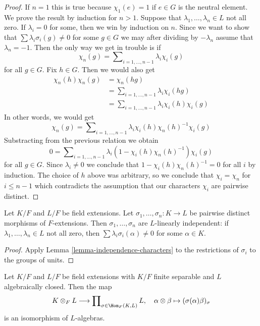 \begin{proof}
If $n = 1$ this is true because $\chi_1(e) = 1$ if $e \in G$ is the
neutral element. We prove the result by induction for $n > 1$.
Suppose that $\lambda_1, \ldots, \lambda_n \in L$ not all zero.
If $\lambda_i = 0$ for some, then we win by induction on $n$.
Since we want to show that $\sum \lambda_i\sigma_i(g) \not = 0$
for some $g \in G$ we may after dividing by $-\lambda_n$
assume that $\lambda_n = -1$. Then the only way we get in trouble
is if
$$
\chi_n(g) = \sum\nolimits_{i = 1, \ldots, n - 1} \lambda_i\chi_i(g)
$$
for all $g \in G$. Fix $h \in G$. Then we would also get
\begin{align*}
\chi_n(h)\chi_n(g) & = \chi_n(hg) \\
& = \sum\nolimits_{i = 1, \ldots, n - 1} \lambda_i\chi_i(hg) \\
& = \sum\nolimits_{i = 1, \ldots, n - 1} \lambda_i\chi_i(h) \chi_i(g)
\end{align*}
In other words, we would get
$$
\chi_n(g) = \sum\nolimits_{i = 1, \ldots, n - 1}
\lambda_i \chi_i(h) \chi_n(h)^{-1}\chi_i(g)
$$
Substracting from the previous relation we obtain
$$
0 = \sum\nolimits_{i = 1, \ldots, n - 1}
\lambda_i (1 - \chi_i(h) \chi_n(h)^{-1}) \chi_i(g)
$$
for all $g \in G$. Since $\lambda_i \not = 0$ we conclude that
$1 - \chi_i(h) \chi_n(h)^{-1} = 0$ for all $i$ by induction.
The choice of $h$ above was arbitrary, so we conclude
that $\chi_i = \chi_n$ for $i \leq n - 1$ which contradicts
the assumption that our characters $\chi_i$ are pairwise distinct.
\end{proof}

\begin{lemma}
\label{lemma-independence-embeddings}
Let $K/F$ and $L/F$ be field extensions. Let
$\sigma_1, \ldots, \sigma_n : K \to L$ be pairwise distinct
morphisms of $F$-extensions. Then $\sigma_1, \ldots, \sigma_n$
are $L$-linearly independent: if $\lambda_1, \ldots, \lambda_n \in L$
not all zero, then $\sum \lambda_i\sigma_i(\alpha) \not = 0$
for some $\alpha \in K$.
\end{lemma}

\begin{proof}
Apply Lemma \ref{lemma-independence-characters} to
the restrictions of $\sigma_i$ to the groups of units.
\end{proof}

\begin{lemma}
\label{lemma-finite-separable-tensor-alg-closed}
Let $K/F$ and $L/F$ be field extensions with
$K/F$ finite separable and $L$ algebraically closed.
Then the map
$$
K \otimes_F L
\longrightarrow
\prod\nolimits_{\sigma \in \Hom_F(K, L)} L,\quad
\alpha \otimes \beta \mapsto (\sigma(\alpha)\beta)_\sigma
$$
is an isomorphism of $L$-algebras.
\end{lemma}

